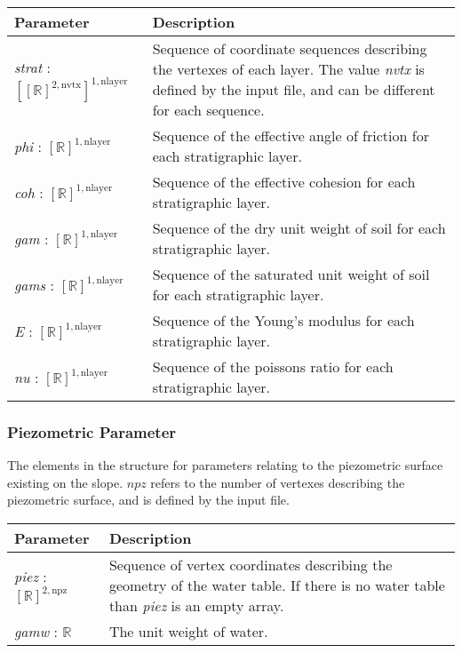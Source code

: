 \documentclass[12pt, titlepage]{article}
\begin{document}
\begin{center}
\begin{longtable}{ p{}
    p{}}\hline

  \textbf{Parameter} & \textbf{Description}\\ \hline

  \textit{strat} : $[[\mathbb{R}]^{2,\text{nvtx}}]^{1,\text{nlayer}}$
  & Sequence of coordinate sequences describing the vertexes of each
  layer. The value \textit{nvtx} is defined by the input file, and can
  be different for each sequence.\\

  \textit{phi} : $[\mathbb{R}]^{1,\text{nlayer}}$ & Sequence of the
  effective angle of friction for each stratigraphic layer.\\

  \textit{coh} : $[\mathbb{R}]^{1,\text{nlayer}}$ & Sequence of the
  effective cohesion for each stratigraphic layer.\\

  \textit{gam} : $[\mathbb{R}]^{1,\text{nlayer}}$ & Sequence of the dry
  unit weight of soil for each stratigraphic layer.\\

  \textit{gams} : $[\mathbb{R}]^{1,\text{nlayer}}$ & Sequence of the
  saturated unit weight of soil for each stratigraphic layer.\\

  \textit{E} : $[\mathbb{R}]^{1,\text{nlayer}}$ & Sequence of the
  Young's modulus for each stratigraphic layer.\\

  \textit{nu} : $[\mathbb{R}]^{1,\text{nlayer}}$ & Sequence of the
  poissons ratio for each stratigraphic layer. \\ \hline
\end{longtable}
\end{center}

\subsubsection{Piezometric Parameter} \label{Tbl:PiezParam}
\noindent
The elements in the structure for parameters relating to the
piezometric surface existing on the slope. $npz$ refers to the number
of vertexes describing the piezometric surface, and is defined by the
input file.

\begin{center}
\begin{longtable}{ p{}
    p{}}\hline 
  \textbf{Parameter} & \textbf{Description}\\ \hline

  \textit{piez} : $[\mathbb{R}]^{2,\text{npz}}$ & Sequence of vertex
  coordinates describing the geometry of the water table. If there is
  no water table than \textit{piez} is an empty array. \\

  \textit{gamw} : $\mathbb{R}$ & The unit weight of water. \\ \hline
\end{longtable}
\end{center}
\end{document}
